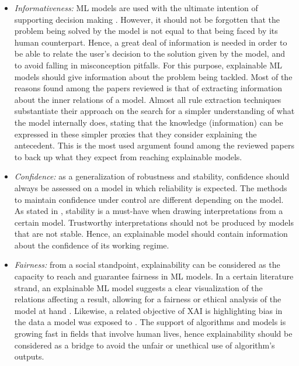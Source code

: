 \documentclass[final]{elsarticle}
\begin{document}
\begin{itemize}[leftmargin=*]
    \item \textit{Informativeness:} ML models are used with the ultimate intention of supporting decision making \cite{huysmans2011Informativeness}. However, it should not be forgotten that the problem being solved by the model is not equal to that being faced by its human counterpart. Hence, a great deal of information is needed in order to be able to relate the user's decision to the solution given by the model, and to avoid falling in misconception pitfalls. For this purpose, explainable ML models should give information about the problem being tackled. Most of the reasons found among the papers reviewed is that of extracting information about the inner relations of a model. Almost all rule extraction techniques substantiate their approach on the search for a simpler understanding of what the model internally does, stating that the knowledge (information) can be expressed in these simpler proxies that they consider explaining the antecedent. This is the most used argument found among the reviewed papers to back up what they expect from reaching explainable models.
    
    \item \textit{Confidence:} as a generalization of robustness and stability, confidence should always be assessed on a model in which reliability is expected. The methods to maintain confidence under control are different depending on the model. As stated in \cite{ruppert1987Stability,basu2018Stability,yu2013stability}, stability is a must-have when drawing interpretations from a certain model. Trustworthy interpretations should not be produced by models that are not stable. Hence, an explainable model should contain information about the confidence of its working regime. 
    
    \item \textit{Fairness:} from a social standpoint, explainability can be considered as the capacity to reach and guarantee fairness in ML models. In a certain literature strand, an explainable ML model suggests a clear visualization of the relations affecting a result, allowing for a fairness or ethical analysis of the model at hand \cite{goodman2017Fair,chouldechova2017fair}. Likewise, a related objective of XAI is highlighting bias in the data a model was exposed to \cite{Burns18,Bennetot19}. The support of algorithms and models is growing fast in fields that involve human lives, hence explainability should be considered as a bridge to avoid the unfair or unethical use of algorithm's outputs.
    

\end{itemize}
\end{document}
